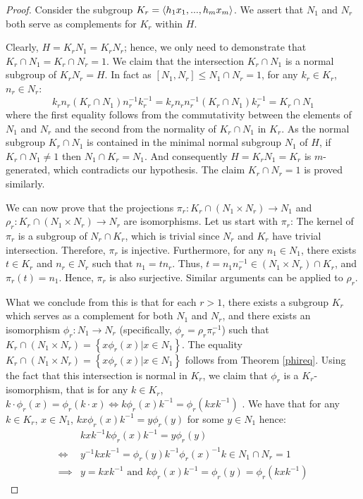 \begin{proof}
    Consider the subgroup $K_r = \langle h_1x_1,...,h_mx_m \rangle$. We assert that $N_1$ and $N_r$ both serve as complements for $K_r$ within $H$.
    
    Clearly, $H = K_rN_1 = K_rN_r$; hence, we only need to demonstrate that $K_r \cap N_1 = K_r \cap N_r = 1$. We claim that the intersection $K_r \cap N_1$ is a normal subgroup of $K_rN_r = H$. In fact as $[N_1, N_r] \le N_1 \cap N_r = 1$, for any $k_r \in K_r$, $n_r \in N_r$:
    $$ 
    k_rn_r(K_r \cap N_1)n_r^{-1}k_r^{-1} = k_rn_rn_r^{-1}(K_r \cap N_1)k_r^{-1} = K_r \cap N_1 
    $$
    where the first equality follows from the commutativity between the elements of $N_1$ and $N_r$ and the second from the normality of $K_r \cap N_1$ in $K_r$.
    As the normal subgroup $K_r \cap N_1$ is contained in the minimal normal subgroup $N_1$ of $H$, if $K_r \cap N_1 \ne 1$ then $N_1 \cap K_r = N_1$. And consequently $H = K_rN_1 = K_r$ is $m$-generated, which contradicts our hypothesis. The claim $K_r \cap N_r = 1$ is proved similarly.

    We can now prove that the projections $\pi_r : K_r \cap (N_1 \times N_r) \rightarrow N_1$ and $\rho_r : K_r \cap (N_1 \times N_r) \rightarrow N_r$ are isomorphisms. 
    Let us start with $\pi_r$: The kernel of $\pi_r$ is a subgroup of $N_r \cap K_r$, which is trivial since $N_r$ and $K_r$ have trivial intersection. Therefore, $\pi_r$ is injective. 
    Furthermore, for any $n_1 \in N_1$, there exists $t \in K_r$ and $n_r \in N_r$ such that $n_1 = tn_r$. Thus, $t = n_1n_r^{-1} \in (N_1 \times N_r) \cap K_r$, and $\pi_r(t) = n_1$. Hence, $\pi_r$ is also surjective.
    Similar arguments can be applied to $\rho_r$.

    What we conclude from this is that for each $r > 1$, there exists a subgroup $K_r$ which serves as a complement for both $N_1$ and $N_r$, and there exists an isomorphism $\phi_r : N_1 \rightarrow N_r$ (specifically, $\phi_r = \rho_r\pi_r^{-1}$) such that $K_r \cap (N_1 \times N_r) = \left\{x\phi_r(x) | x \in N_1\right\}$. 
    The equality $K_r \cap (N_1 \times N_r) = \left\{x\phi_r(x) | x \in N_1\right\}$ follows from Theorem \ref{phireq}.
    Using the fact that this intersection is normal in $K_r$, we claim that $\phi_r$ is a $K_r$-isomorphism, that is for any $k \in K_r$, $k \cdot \phi_r(x) = \phi_r(k \cdot x) \iff k\phi_r(x)k^{-1} = \phi_r(kxk^{-1})$ . We have that for any $k \in K_r$, $x \in N_1$, $kx\phi_r(x)k^{-1} = y\phi_r(y)$ for some $y \in N_1$ hence:
    \begin{align*}
        &kxk^{-1}k\phi_r(x)k^{-1} = y\phi_r(y)\\
        \iff &y^{-1}kxk^{-1} = \phi_r(y)k^{-1}\phi_r(x)^{-1}k \in N_1 \cap N_r = 1\\
        \implies &y = kxk^{-1} \text{ and } k\phi_r(x)k^{-1} = \phi_r(y) = \phi_r(kxk^{-1})
    \end{align*}


\end{proof}
